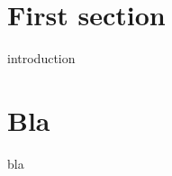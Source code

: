 \documentclass{article}
\begin{document}
    \section{First section}
    {introduction}
    \section{Bla}
    {bla}
\end{document}
